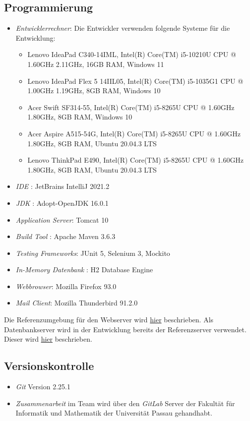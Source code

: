 \subsection{Programmierung}
\begin{itemize}
	\item \emph{Entwicklerrechner}: Die Entwickler verwenden folgende Systeme für die Entwicklung:
		\begin{itemize}
			\item Lenovo IdeaPad C340-14IML, Intel(R) Core(TM) i5-10210U CPU @ 1.60GHz 2.11GHz, 16GB RAM, Windows 11
			\item Lenovo IdeaPad Flex 5 14IIL05, Intel(R) Core(TM) i5-1035G1 CPU @ 1.00GHz 1.19GHz, 8GB RAM, Windows 10
			\item Acer Swift SF314-55, Intel(R) Core(TM) i5-8265U CPU @ 1.60GHz 1.80GHz, 8GB RAM, Windows 10
			\item Acer Aspire A515-54G, Intel(R) Core(TM) i5-8265U CPU @ 1.60GHz 1.80GHz, 8GB RAM, Ubuntu 20.04.3 LTS
			\item Lenovo ThinkPad E490, Intel(R) Core(TM) i5-8265U CPU @ 1.60GHz 1.80GHz, 8GB RAM, Ubuntu 20.04.3 LTS
		\end{itemize}
	\item \emph{IDE }: JetBrains IntelliJ 2021.2
	\item \emph{JDK }: Adopt-OpenJDK 16.0.1
	\item \emph{Application Server}: Tomcat 10
	\item \emph{Build Tool }: Apache Maven 3.6.3
	\item \emph{Testing Frameworks}: JUnit 5, Selenium 3, Mockito
	\item \emph{In-Memory Datenbank }: H2 Database Engine
	\item \emph{Webbrowser}: Mozilla Firefox 93.0
	\item \emph{Mail Client}: Mozilla Thunderbird 91.2.0
\end{itemize}
Die Referenzumgebung für den Webserver wird \hyperref[spezi]{hier} beschrieben.
Als Datenbankserver wird in der Entwicklung bereits der Referenzserver verwendet. Dieser wird \hyperref[dbspezi]{hier} beschrieben.
\subsection{Versionskontrolle}
\begin{itemize}
	\item \emph{Git} Version 2.25.1
	\item \emph{Zusammenarbeit} im Team wird über den \emph{GitLab } Server der Fakultät für Informatik und Mathematik der Universität Passau gehandhabt.
\end{itemize}
